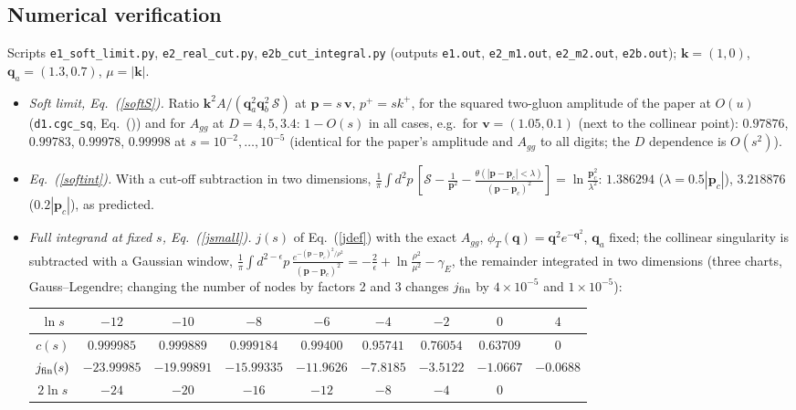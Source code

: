 \documentclass[11pt,a4paper]{article}
\renewcommand{\v}[1]{\bm{#1}}
\newcommand{\dref}[1]{\texttt{\detokenize{#1}}}
\begin{document}
\subsection{Numerical verification}\label{sec:softnum}
Scripts \texttt{e1\_soft\_limit.py}, \texttt{e2\_real\_cut.py}, \texttt{e2b\_cut\_integral.py} (outputs \texttt{e1.out}, \texttt{e2\_m1.out}, \texttt{e2\_m2.out}, \texttt{e2b.out}); $\v k=(1,0)$, $\v q_a=(1.3,0.7)$, $\mu=|\v k|$.
\begin{itemize}
\item \emph{Soft limit, Eq.~(\ref{softS}).} Ratio $\v k^2A/(\v q_a^2\v q_b^2\,\mathcal S)$ at $\v p=s\,\v v$, $p^+=sk^+$, for the squared two-gluon amplitude of the paper at $O(u)$ (\texttt{d1.cgc\_sq}, Eq.~(\dref{eq:A2gamp})) and for $A_{gg}$ at $D=4,5,3.4$: $1-O(s)$ in all cases, e.g.\ for $\v v=(1.05,0.1)$ (next to the collinear point): $0.97876$, $0.99783$, $0.99978$, $0.99998$ at $s=10^{-2},\dots,10^{-5}$ (identical for the paper's amplitude and $A_{gg}$ to all digits; the $D$ dependence is $O(s^2)$).
\item \emph{Eq.~(\ref{softint}).} With a cut-off subtraction in two dimensions, $\frac1\pi\int d^2p\,[\mathcal S-\frac1{\v p^2}-\frac{\theta(|\v p-\v p_c|<\lambda)}{(\v p-\v p_c)^2}]=\ln\frac{\v p_c^2}{\lambda^2}$: $1.386294$ ($\lambda=0.5|\v p_c|$), $3.218876$ ($0.2|\v p_c|$), as predicted.
\item \emph{Full integrand at fixed $s$, Eq.~(\ref{jsmall}).} $j(s)$ of Eq.~(\ref{jdef}) with the exact $A_{gg}$, $\phi_T(\v q)=\v q^2e^{-\v q^2}$, $\v q_a$ fixed; the collinear singularity is subtracted with a Gaussian window, $\frac1\pi\int d^{2-\epsilon}p\,\frac{e^{-(\v p-\v p_c)^2/\rho^2}}{(\v p-\v p_c)^2}=-\frac2\epsilon+\ln\frac{\rho^2}{\mu^2}-\gamma_E$, the remainder integrated in two dimensions (three charts, Gauss--Legendre; changing the number of nodes by factors 2 and 3 changes $j_{\rm fin}$ by $4\times10^{-5}$ and $1\times10^{-5}$):
\begin{center}\small\setlength{\tabcolsep}{4pt}
\begin{tabular}{|c|cccccccc|}\hline
$\ln s$ & $-12$ & $-10$ & $-8$ & $-6$ & $-4$ & $-2$ & $0$ & $4$\\\hline
$c(s)$ & $0.999985$ & $0.999889$ & $0.999184$ & $0.99400$ & $0.95741$ & $0.76054$ & $0.63709$ & $0$\\
$j_{\rm fin}(s)$ & $-23.99985$ & $-19.99891$ & $-15.99335$ & $-11.9626$ & $-7.8185$ & $-3.5122$ & $-1.0667$ & $-0.0688$\\
$2\ln s$ & $-24$ & $-20$ & $-16$ & $-12$ & $-8$ & $-4$ & $0$ & \\\hline

\end{tabular}
\end{center}
\end{itemize}
\end{document}
